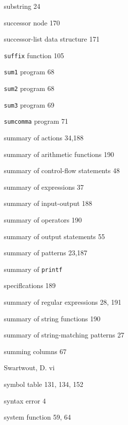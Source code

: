 \begin{multicols}{3}
\hangindent=3pc  substring 24

\hangindent=3pc  successor node 170

\hangindent=3pc  successor-list data structure 171

\hangindent=3pc  \verb'suffix' function 105







\hangindent=3pc  \verb'sum1' program 68

\hangindent=3pc  \verb'sum2' program 68

\hangindent=3pc  \verb'sum3' program 69

\hangindent=3pc  \verb'sumcomma' program 71

\hangindent=3pc  summary of actions 34,188

\hangindent=3pc  summary of arithmetic functions 190

\hangindent=3pc  summary of control-flow statements 48

\hangindent=3pc  summary of expressions 37

\hangindent=3pc  summary of input-output 188

\hangindent=3pc  summary of operators 190

\hangindent=3pc  summary of output statements 55

\hangindent=3pc  summary of patterns 23,187

\hangindent=3pc  summary of \verb'printf'

\hangindent=3pc  speciflcations 189

\hangindent=3pc  summary of regular expressions 28, 191

\hangindent=3pc  summary of string functions 190

\hangindent=3pc  summary of string-matching patterns 27

\hangindent=3pc  summing columns 67

\hangindent=3pc  Swartwout, D. vi

\hangindent=3pc  symbol table 131, 134, 152

\hangindent=3pc  syntax error 4

\hangindent=3pc  system function 59, 64


\end{multicols}
